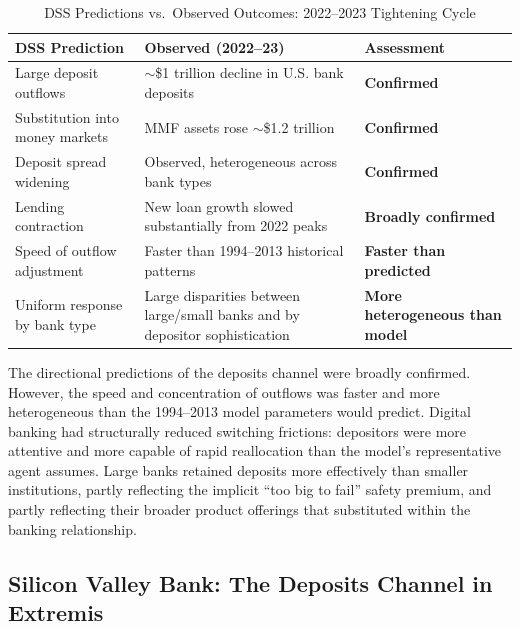 \documentclass[12pt,a4paper]{article}
\begin{document}
\begin{table}[H]
\centering
\caption{DSS Predictions vs.\ Observed Outcomes: 2022--2023 Tightening Cycle}
\label{tab:2023_test}
\small
\begin{tabular}{p{5.0cm} p{4.0cm} p{4.5cm}}
\toprule
\textbf{DSS Prediction} & \textbf{Observed (2022--23)} &
  \textbf{Assessment} \\
\midrule
Large deposit outflows & $\sim$\$1 trillion decline in
  U.S. bank deposits & \textcolor{OliveGreen}{\textbf{Confirmed}} \\[4pt]

Substitution into money markets & MMF assets rose $\sim$\$1.2 trillion &
  \textcolor{OliveGreen}{\textbf{Confirmed}} \\[4pt]

Deposit spread widening & Observed, heterogeneous across bank types &
  \textcolor{OliveGreen}{\textbf{Confirmed}} \\[4pt]

Lending contraction &
  New loan growth slowed substantially from 2022 peaks &
  \textcolor{OliveGreen}{\textbf{Broadly confirmed}} \\[4pt]

Speed of outflow adjustment &
  Faster than 1994--2013 historical patterns &
  \textcolor{orange!80!black}{\textbf{Faster than predicted}} \\[4pt]

Uniform response by bank type &
  Large disparities between large/small banks and by depositor
  sophistication &
  \textcolor{orange!80!black}{\textbf{More heterogeneous than model}} \\
\bottomrule
\end{tabular}
\end{table}

The directional predictions of the deposits channel were broadly confirmed.
However, the speed and concentration of outflows was faster and more
heterogeneous than the 1994--2013 model parameters would predict. Digital
banking had structurally reduced switching frictions: depositors were more
attentive and more capable of rapid reallocation than the model's
representative agent assumes. Large banks retained deposits more effectively
than smaller institutions, partly reflecting the implicit ``too big to fail''
safety premium, and partly reflecting their broader product offerings that
substituted within the banking relationship.

\subsection{Silicon Valley Bank: The Deposits Channel in Extremis}
\end{document}
